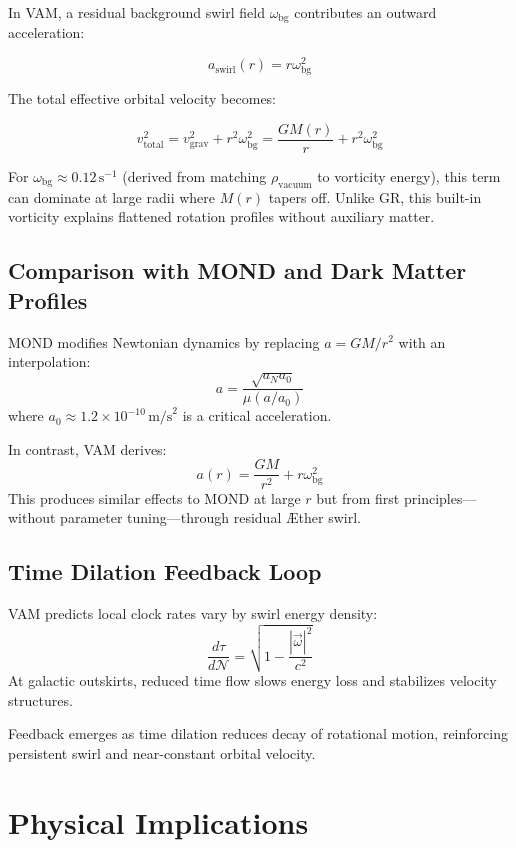 \documentclass[12pt]{article}
\begin{document}
    In VAM, a residual background swirl field $\omega_{\text{bg}}$ contributes an outward acceleration:

    \[
        a_{\text{swirl}}(r) = r \omega_{\text{bg}}^2
    \]

    The total effective orbital velocity becomes:

    \[
        v_{\text{total}}^2 = v_{\text{grav}}^2 + r^2 \omega_{\text{bg}}^2 = \frac{G M(r)}{r} + r^2 \omega_{\text{bg}}^2
    \]

    For $\omega_{\text{bg}} \approx 0.12 \, \text{s}^{-1}$ (derived from matching $\rho_{\text{vacuum}}$ to vorticity energy), this term can dominate at large radii where $M(r)$ tapers off. Unlike GR, this built-in vorticity explains flattened rotation profiles without auxiliary matter.

    \subsection{Comparison with MOND and Dark Matter Profiles}

    MOND modifies Newtonian dynamics by replacing $a = GM/r^2$ with an interpolation:
    \[
        a = \frac{\sqrt{a_N a_0}}{\mu(a/a_0)}
    \]
    where $a_0 \approx 1.2 \times 10^{-10} \, \text{m/s}^2$ is a critical acceleration.

    In contrast, VAM derives:
    \[
        a(r) = \frac{G M}{r^2} + r \omega_{\text{bg}}^2
    \]
    This produces similar effects to MOND at large $r$ but from first principles—without parameter tuning—through residual \AE{}ther swirl.

    \subsection{Time Dilation Feedback Loop}

    VAM predicts local clock rates vary by swirl energy density:
    \[
        \frac{d\tau}{d\mathcal{N}} = \sqrt{1 - \frac{|\vec{\omega}|^2}{c^2}}
    \]
    At galactic outskirts, reduced time flow slows energy loss and stabilizes velocity structures.

    Feedback emerges as time dilation reduces decay of rotational motion, reinforcing persistent swirl and near-constant orbital velocity.

    \section{Physical Implications}
\end{document}
